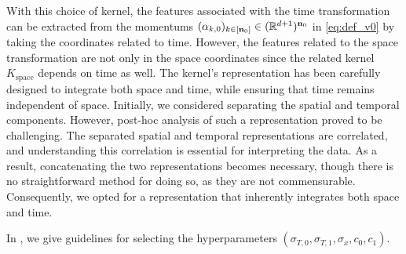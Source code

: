     \begin{remark}
      \label{remark:spaceandtime}
      With this choice of kernel, the features associated with the time transformation can be extracted from the momentums $(\alpha_{k,0})_{k\in[\mathbf{n}_0]}\in (\mathbb{R}^{d+1})^{\mathbf{n}_0}$ in \eqref{eq:def_v0} by taking the coordinates related to time.
      However, the features related to the space transformation are not only in the space coordinates since the related kernel $K_{\text{space}}$ depends on time as well.
      The kernel's representation has been carefully designed to integrate both space and time, while ensuring that time remains independent of space.
       Initially, we considered separating the spatial and temporal components.
        However, post-hoc analysis of such a representation proved to be challenging.
         The separated spatial and temporal representations are correlated, and understanding this correlation is essential for interpreting the data.
          As a result, concatenating the two representations becomes necessary, though there is no straightforward method for doing so, as they are not commensurable.
           Consequently, we opted for a representation that inherently integrates both space and time.
      \end{remark}
      In , we give guidelines for selecting the hyperparameters $(\sigma_{T,0},\sigma_{T,1},\sigma_x,c_0,c_1)$.
  
  
    





